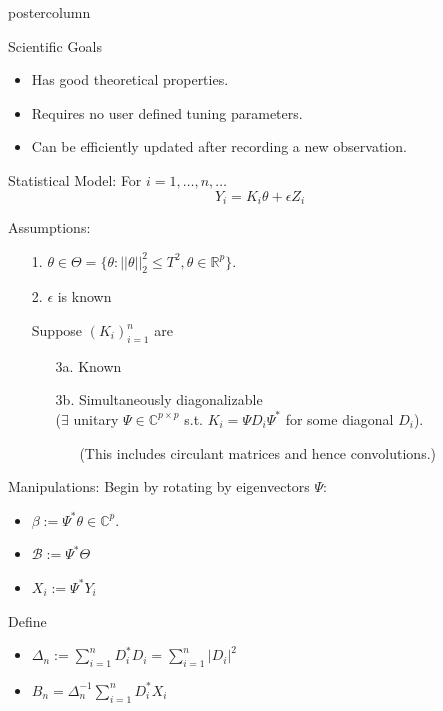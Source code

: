 \documentclass[final]{beamer}
\begin{document}
\begin{frame}
\begin{columns}
\begin{column}{.32\textwidth}
\begin{beamercolorbox}[center,wd=\textwidth]{postercolumn}
\begin{minipage}[T]{.95\textwidth}
{\begin{alertblock}{Scientific Goals}
              \begin{itemize}
              \item Has good theoretical properties.
              \item Requires no user defined tuning parameters.
              \item Can be efficiently updated after recording a new observation.
              \end{itemize}
            \end{alertblock}
          \vfill
          \begin{block}{Statistical Model:}
For $i = 1,\ldots,n,\ldots$
\[
Y_i = K_i\theta + \epsilon Z_i
\]
\end{block}
\begin{block}{Assumptions:}
\begin{itemize}
\item[1.] $\displaystyle{\theta \in \Theta = \{\theta : ||\theta ||_2^2 \leq T^2, \theta \in \mathbb{R}^p\}}$. \\
\item[2.] $\epsilon$ is known 
\item[] Suppose $(K_i)_{i=1}^n$ are
  \begin{itemize}
    \item[3a.] Known
    \item[3b.] Simultaneously diagonalizable \\
    ($\exists$ unitary $\Psi \in \mathbb{C}^{p\times p}$ s.t. $K_i = \Psi D_i \Psi^*$ for some diagonal $D_i$).
      \begin{itemize}
        \item[] \textcolor{blue!75!white}{(This includes circulant matrices and hence convolutions.)}
      \end{itemize}
  \end{itemize}
\end{itemize}
          \end{block}
\begin{block}{Manipulations:}
Begin by rotating by eigenvectors $\Psi$:
\begin{itemize}
\item $\beta := \Psi^* \theta \in \mathbb{C}^p$.
\item $\mathcal{B} := \Psi^* \Theta$
\item $X_i := \Psi^* Y_i$
\end{itemize}
Define 
\begin{itemize}
\item $\displaystyle{\Delta_n := \sum_{i=1}^n D_i^*D_i = \sum_{i=1}^n |D_i|^2}$
\item $B_n = \Delta_n^{-1}\sum_{i=1}^n D_i^*X_i $
\end{itemize}


\end{block}}
\end{minipage}
\end{beamercolorbox}
\end{column}
\end{columns}
\end{frame}
\end{document}
